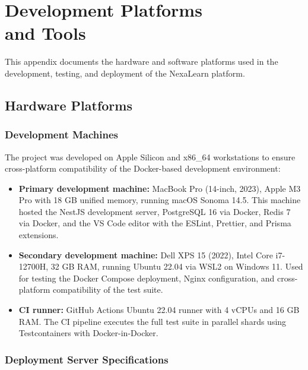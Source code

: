 
\chapter{\texorpdfstring{Development Platforms\\and Tools}{Development Platforms and Tools}}
\label{app:platforms}

This appendix documents the hardware and software platforms used in the development, testing, and deployment of the NexaLearn platform.

\section{Hardware Platforms}
\label{sec:app-hardware}

\subsection{Development Machines}

The project was developed on Apple Silicon and x86\_64 workstations to ensure cross-platform compatibility of the Docker-based development environment:

\begin{itemize}
  \item \textbf{Primary development machine:} MacBook Pro (14-inch, 2023), Apple M3 Pro with 18 GB unified memory, running macOS Sonoma 14.5. This machine hosted the NestJS development server, PostgreSQL 16 via Docker, Redis 7 via Docker, and the VS Code editor with the ESLint, Prettier, and Prisma extensions.
  \item \textbf{Secondary development machine:} Dell XPS 15 (2022), Intel Core i7-12700H, 32 GB RAM, running Ubuntu 22.04 via WSL2 on Windows 11. Used for testing the Docker Compose deployment, Nginx configuration, and cross-platform compatibility of the test suite.
  \item \textbf{CI runner:} GitHub Actions Ubuntu 22.04 runner with 4 vCPUs and 16 GB RAM. The CI pipeline executes the full test suite in parallel shards using Testcontainers with Docker-in-Docker.
\end{itemize}

\subsection{Deployment Server Specifications}

